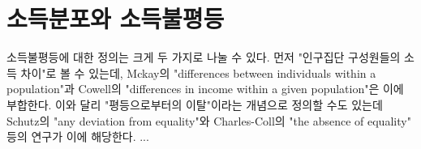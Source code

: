\chapter{소득분포와 소득불평등}
	
	소득불평등에 대한 정의는 크게 두 가지로 나눌 수 있다. 
	먼저 "인구집단 구성원들의 소득 차이"로 볼 수 있는데, 
	Mckay의 "differences between individuals within a population"과 
	Cowell의 "differences in income within a given population"은 이에 부합한다.
	이와 달리 "평등으로부터의 이탈"이라는 개념으로 정의할 수도 있는데 
	Schutz의 "any deviation from equality"와
	Charles-Coll의 "the absence of equality" 등의 연구가 이에 해당한다.
	...
	